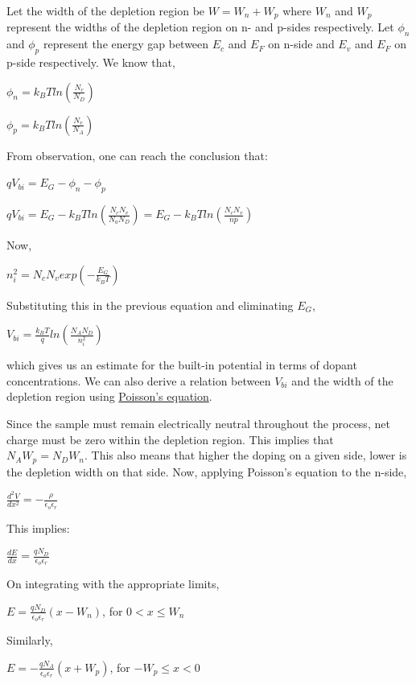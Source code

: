 \documentclass[12 pt]{article}
\begin{document}
Let the width of the depletion region be $ W = W_{n} + W_{p}$ where $W_{n}$ and $W_{p}$ represent the widths of the depletion region on n- and p-sides respectively. Let $\phi_n$ and $\phi_p$ represent the energy gap between $E_{c}$ and $E_{F}$ on n-side and $E_{v}$ and $E_{F}$ on p-side respectively. We know that,
\begin{center}
    $\phi_n = k_{B}T ln(\frac{N_{c}}{N_{D}}) $
\end{center}
\begin{center}
    $\phi_p = k_{B}T ln(\frac{N_{v}}{N_{A}})   $
\end{center}

From observation, one can reach the conclusion that:
\begin{center}
    $  qV_{bi} = E_{G} - \phi_{n} - \phi_{p} $
\end{center}

\begin{center}
    $ qV_{bi} = E_{G} - k_{B}T ln(\frac{N_{c}N_{v}}{N_{a}N_{D}}) = E_{G} - k_{B}T ln(\frac{N_{c}N_{v}}{np}) $
\end{center}

Now, 
\begin{center}
    $ n_{i}^{2} = N_{c}N_{v}exp(-\frac{E_{G}}{k_{B}T})  $
\end{center}
Substituting this in the previous equation and eliminating $E_{G}$,
\begin{center}
    $  V_{bi} = \frac{k_{B}T}{q} ln(\frac{N_{A}N_{D}}{n_{i}^{2}})    $
\end{center}
which gives us an estimate for the built-in potential in terms of dopant concentrations. We can also derive a relation between $V_{bi}$ and the width of the depletion region using \href{https://en.wikipedia.org/wiki/Poisson%27s_equation}{Poisson's equation}.\par
Since the sample must remain electrically neutral throughout the process, net charge must be zero within the depletion region. This implies that $ N_{A}W_{p} = N_{D}W_{n}$. This also means that higher the doping on a given side, lower is the depletion width on that side. Now, applying Poisson's equation to the n-side, 
\begin{center}
    $ \frac{d^{2}V}{dx^{2}} = -\frac{\rho}{\epsilon_{o}\epsilon_{r}}   $
\end{center}
This implies:
\begin{center}
    $  \frac{dE}{dx} = \frac{qN_{D}}{\epsilon_{o}\epsilon_{r}}   $
\end{center}
On integrating with the appropriate limits,
\begin{center}
    $  E = \frac{qN_{D}}{\epsilon_{o}\epsilon_{r}}(x-W_{n})  $, for $0 < x \leq   W_{n}$
\end{center}
Similarly, 
\begin{center}
    $ E = -\frac{qN_{A}}{\epsilon_{o}\epsilon_{r}}(x+W_{p})    $, for $-W_{p} \leq x < 0$
\end{center}
\end{document}
